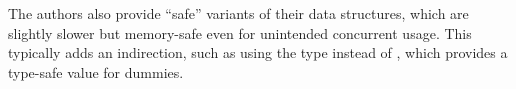 The \Saturn authors also provide ``safe'' variants of their data structures, which are slightly slower but memory-safe even for unintended concurrent usage. This typically adds an indirection, such as using the type  instead of , which provides a type-safe  value for dummies.

